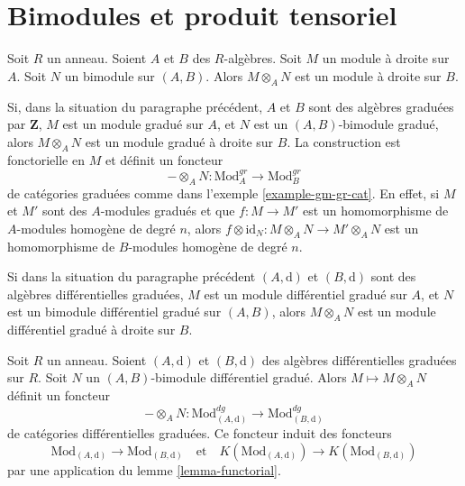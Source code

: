 \section{Bimodules et produit tensoriel}
\label{section-bimodules-tensor}

\noindent
Soit $R$ un anneau. Soient $A$ et $B$ des $R$-algèbres. Soit $M$ un module à
droite sur $A$. Soit $N$ un bimodule sur $(A, B)$. Alors $M
\otimes_A N$ est un module à droite sur $B$.

\medskip\noindent
Si, dans la situation du paragraphe précédent, $A$
et $B$ sont des algèbres graduées par $\mathbf{Z}$,
$M$ est un module gradué sur $A$, et $N$ est un $(A, B)$-bimodule gradué,
alors $M \otimes_A N$ est un module gradué à droite sur $B$. La construction
est fonctorielle en $M$ et définit un foncteur
$$
- \otimes_A N :
\text{Mod}^{gr}_A
\longrightarrow
\text{Mod}^{gr}_B
$$
de catégories graduées comme dans l'exemple \ref{example-gm-gr-cat}. En
effet, si $M$ et $M'$ sont des $A$-modules gradués et que $f : M \to M'$ est un
homomorphisme de $A$-modules homogène de degré $n$,
alors $f \otimes \text{id}_N : M \otimes_A N \to M' \otimes_A N$
est un homomorphisme de $B$-modules homogène de degré $n$.

\medskip\noindent
Si dans la situation du paragraphe précédent $(A,
\text{d})$ et $(B, \text{d})$ sont des algèbres différentielles graduées, $M$
est un module différentiel gradué sur $A$, et $N$ est un bimodule
différentiel gradué sur $(A, B)$, alors $M \otimes_A N$ est un module
différentiel gradué à droite sur $B$.

\begin{lemma}
\label{lemma-tensor}
Soit $R$ un anneau. Soient $(A, \text{d})$ et $(B, \text{d})$
des algèbres différentielles graduées sur $R$. Soit $N$ un
$(A, B)$-bimodule différentiel gradué. Alors
$M \mapsto M \otimes_A N$ définit un foncteur
$$
- \otimes_A N :
\text{Mod}^{dg}_{(A, \text{d})}
\longrightarrow
\text{Mod}^{dg}_{(B, \text{d})}
$$
de catégories différentielles graduées. Ce foncteur induit des foncteurs
$$
\text{Mod}_{(A, \text{d})} \to \text{Mod}_{(B, \text{d})}
\quad\text{et}\quad
K(\text{Mod}_{(A, \text{d})}) \to K(\text{Mod}_{(B, \text{d})})
$$
par une application du lemme \ref{lemma-functorial}.
\end{lemma}

